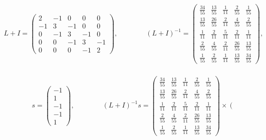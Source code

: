 \clearpage

\begin{equation}
	\begin{aligned}
		\\
		L+I=
		\left(\begin{matrix}
		2 & -1 & 0 & 0 & 0 \\
		-1 & 3 & -1 & 0 & 0 \\
		0 & -1 & 3 & -1 & 0 \\
		0 & 0 & -1 & 3 & -1 \\
		0 & 0 & 0 & -1 & 2
		\end{matrix}\right),
		\qquad \qquad 
		(L+I)^{-1}=
		\left(\begin{matrix}
		\frac{34}{55} & \frac{13}{55} & \frac{1}{11} & \frac{2}{55} & \frac{1}{55} \\
		\frac{13}{55} & \frac{26}{55} & \frac{2}{11} & \frac{4}{55} & \frac{2}{55} \\
		\frac{1}{11} & \frac{2}{11} & \frac{5}{11} & \frac{2}{11} & \frac{1}{11} \\
		\frac{2}{55} & \frac{4}{55} & \frac{2}{11} & \frac{26}{55} & \frac{13}{55} \\
		\frac{1}{55} & \frac{2}{55} & \frac{1}{11} & \frac{13}{55} & \frac{34}{55}
		\end{matrix}\right)
		,
		\\
		\\
		\\
		\\
		\qquad \qquad
		s=
		\left(\begin{matrix}
		-1 \\
		1 \\
		-1 \\
		-1 \\
		1
		\end{matrix}\right)
		,
		\qquad \qquad
		(L+I)^{-1}s=
		\left(\begin{matrix}
		\frac{34}{55} & \frac{13}{55} & \frac{1}{11} & \frac{2}{55} & \frac{1}{55} \\
		\frac{13}{55} & \frac{26}{55} & \frac{2}{11} & \frac{4}{55} & \frac{2}{55} \\
		\frac{1}{11} & \frac{2}{11} & \frac{5}{11} & \frac{2}{11} & \frac{1}{11} \\
		\frac{2}{55} & \frac{4}{55} & \frac{2}{11} & \frac{26}{55} & \frac{13}{55} \\
		\frac{1}{55} & \frac{2}{55} & \frac{1}{11} & \frac{13}{55} & \frac{34}{55}
		\end{matrix}\right)
		\times
		\left(\begin{matrix}

\end{matrix}
\end{aligned}
\end{equation}
